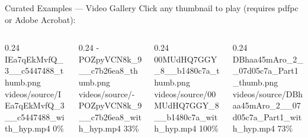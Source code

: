 \begin{frame}{Curated Examples --- Video Gallery}
  {\small Click any thumbnail to play (requires pdfpc or Adobe Acrobat):}

  \vspace{4pt}

  \begin{columns}[c]
    \begin{column}{0.24\textwidth}
      \videocaptioned{\linewidth}%
        {IEa7qEkMvfQ_3__c5447488_thumb.png}%
        {videos/source/IEa7qEkMvfQ_3__c5447488_with_hyp.mp4}%
        { 0\%}
    \end{column}
    \begin{column}{0.24\textwidth}
      \videocaptioned{\linewidth}%
        {-POZpyVCN8k_9__c7b26ea8_thumb.png}%
        {videos/source/-POZpyVCN8k_9__c7b26ea8_with_hyp.mp4}%
        { 33\%}
    \end{column}
    \begin{column}{0.24\textwidth}
      \videocaptioned{\linewidth}%
        {00MUdHQ7GGY_8__b1480c7a_thumb.png}%
        {videos/source/00MUdHQ7GGY_8__b1480c7a_with_hyp.mp4}%
        { 100\%}
    \end{column}
    \begin{column}{0.24\textwidth}
      \videocaptioned{\linewidth}%
        {DBhaa45mAro_2__07d05c7a_Part1_thumb.png}%
        {videos/source/DBhaa45mAro_2__07d05c7a_Part1_with_hyp.mp4}%
        { 73\%}
    \end{column}
  \end{columns}

  \vspace{6pt}


\end{frame}
